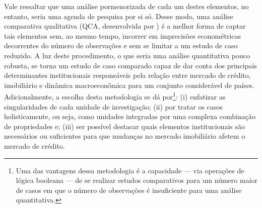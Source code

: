 Vale ressaltar que uma análise pormenorizada de cada um destes elementos, no entanto, seria uma agenda de pesquisa por si só. Desse modo, uma análise comparativa qualitativa (QCA, desenvolvida por \textcite{ragin_comparative_1989}) é a melhor forma de captar tais elementos sem, ao mesmo tempo, incorrer em imprecisões econométricas decorrentes do número de observações e sem se limitar a um estudo de caso reduzido. A luz deste procedimento, o que seria uma análise quantitativa pouco robusta, se torna um estudo de caso comparado capaz de dar conta dos principais determinantes institucionais responsáveis pela relação entre mercado de crédito, imobiliário e dinâmica macroeconômica para um conjunto considerável de países. Adicionalmente, a escolha desta metodologia se dá por\footnote{Uma das vantagens dessa metodologia é a capacidade --- via operações de lógica booleana --- de se realizar estudos comparativos para um número maior de casos em que o número de observações é insuficiente para uma análise quantitativa.}: (i) enfatizar as singularidades de cada unidade de investigação; (ii) por tratar os casos holisticamente, ou seja, como unidades integradas por uma complexa combinação de propriedades e; (iii) ser possível destacar quais elementos institucionais são necessários ou suficientes para que mudanças no mercado imobiliário afetem o mercado de crédito.

